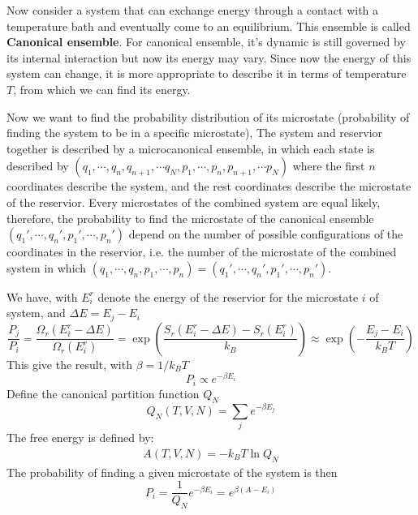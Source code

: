 \documentclass{article}
\begin{document}
Now consider a system that can exchange energy through a contact with a temperature bath and eventually 
come to an equilibrium. This ensemble is called \textbf{Canonical ensemble}. For canonical ensemble, 
it's dynamic is still governed by its internal interaction but now its energy may vary. Since now 
the energy of this system can change, it is more appropriate to describe it in terms of 
temperature $T$, from which we can find its energy. 

Now we want to find the probability distribution of its microstate (probability of finding the system 
to be in a specific microstate), The system and reservior together is described by a microcanonical 
ensemble, in which each state is described by $(q_1,\cdots, q_n, q_{n+1}, \cdots q_{N}, p_1,\cdots, p_n, p_{n+1}, \cdots p_{N})$
where the first $n$ coordinates describe the system, and the rest coordinates describe the 
microstate of the reservior. Every microstates of the combined system are equal likely, therefore,
the probability to find the microstate of the canonical ensemble $(q_1',\cdots, q_n',p_1',\cdots, p_n')$ depend on the number 
of possible configurations of the coordinates in the reservior, i.e. the number of the 
microstate of the combined system in which $(q_1,\cdots, q_n,p_1,\cdots, p_n) = (q_1',\cdots, q_n',p_1',\cdots, p_n')$.

We have, with $E^r_i$ denote the energy of the reservior for 
the microstate $i$ of system, and $\Delta E = E_j - E_i$
\begin{equation}
    \frac{P_j}{P_i} = \frac{\Omega_r(E^r_i - \Delta E)}{\Omega_r(E^r_i)} = \exp\left( \frac{S_r(E^r_i-\Delta E)-S_r(E^r_i)}{k_B} \right)
    \approx \exp\left( -\frac{E_j-E_i}{k_BT} \right)
\end{equation}
This give the result, with $\beta = 1/k_BT$
\begin{equation}
    P_i \propto e^{-\beta E_i}
\end{equation}
Define the canonical partition function $Q_N$
\begin{equation}
    Q_N(T,V,N) = \sum_j e^{-\beta E_j}
\end{equation}
The free energy is defined by:
\begin{gather}
    A(T,V,N) = -k_BT\ln Q_N
\end{gather}
The probability of finding a given microstate of the system is then
\begin{equation}
    P_i = \frac{1}{Q_N} e^{-\beta E_i} = e^{\beta(A - E_i)}
\end{equation}
\end{document}
